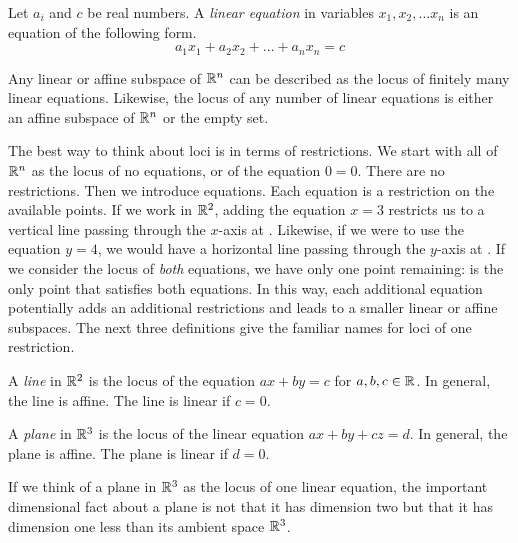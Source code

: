 \documentclass[fleqn]{report}
\begin{document}
\begin{defn}
Let $a_i$ and $c$ be real numbers. A \emph{linear equation} in
variables $x_1, x_2, \ldots x_n$ is an equation of the
following form.
\begin{equation*}
a_1 x_1 + a_2 x_2 + \ldots + a_n x_n = c
\end{equation*}
\end{defn}

\begin{prop}
Any linear or affine subspace of $\mathbb{R}^n$ can be described as the
locus of finitely many linear equations. Likewise, the locus
of any number of linear equations is either an affine subspace of
$\mathbb{R}^n$ or the empty set.
\end{prop}

The best way to think about loci is in terms of
restrictions. We start with all of $\mathbb{R}^n$ as the locus of no
equations, or of the equation $0=0$. There are no restrictions.
Then we introduce equations. Each equation is a restriction
on the available points. If we work in $\mathbb{R}^2$, adding the
equation $x=3$ restricts us to a vertical line passing through
the $x$-axis at . Likewise, if
we were to use the equation $y=4$, we would have a horizontal
line passing through the $y$-axis at
. If we consider the locus
of \emph{both} equations, we have only one point remaining: 
 is the only point that
satisfies both equations. In this way, each additional
equation potentially adds an additional restrictions and leads
to a smaller linear or affine subspaces. The next three
definitions give the familiar names for loci of one
restriction.

\begin{defn}
A \emph{line} in $\mathbb{R}^2$ is the locus of the equation $ax + by
= c$ for $a,b,c \in \mathbb{R}$. In general, the line is affine. The
line is linear if $c=0$. 
\end{defn}

\begin{defn}
A \emph{plane} in $\mathbb{R}^3$ is the locus of the linear equation
$ax + by + cz = d$. In general, the plane is affine. The
plane is linear if $d=0$. 
\end{defn}

If we think of a plane in $\mathbb{R}^3$ as the locus of one linear
equation, the important dimensional fact about a plane is
not that it has dimension two but that it has dimension one
less than its ambient space $\mathbb{R}^3$. 
\end{document}
